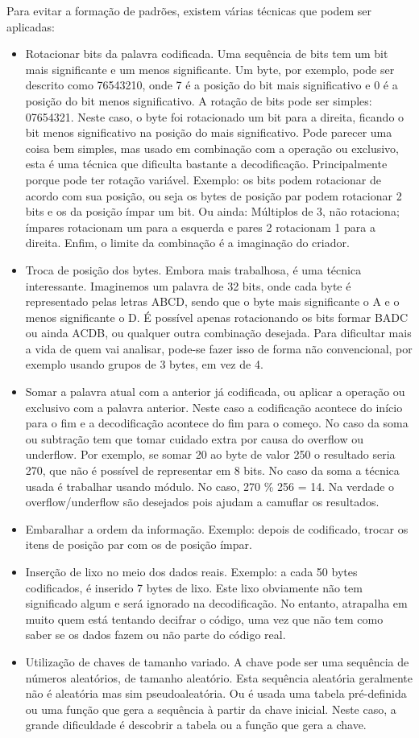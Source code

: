 Para evitar a formação de padrões, existem várias técnicas que podem ser aplicadas:
\begin{itemize}
\item Rotacionar bits da palavra codificada. Uma sequência de bits tem um bit mais significante e um menos significante. Um byte, por exemplo, pode ser descrito como 76543210, onde 7 é a posição do bit mais significativo e 0 é a posição do bit menos significativo. A rotação de bits pode ser simples: 07654321. Neste caso, o byte foi rotacionado um bit para a direita, ficando o bit menos significativo na posição do mais significativo. Pode parecer uma coisa bem simples, mas usado em combinação com a operação ou exclusivo, esta é uma técnica que dificulta bastante a decodificação. Principalmente porque pode ter rotação variável. Exemplo: os bits  podem rotacionar de acordo com sua posição, ou seja os bytes de posição par podem rotacionar 2 bits e os da  posição ímpar um bit. Ou ainda: Múltiplos de 3, não rotaciona; ímpares rotacionam um para a esquerda e pares 2 rotacionam 1 para a direita. Enfim, o limite da combinação é a imaginação do criador. 
\item Troca de posição dos bytes. Embora mais trabalhosa, é uma técnica interessante. Imaginemos um palavra de 32 bits, onde cada byte é representado pelas letras ABCD, sendo que o byte mais significante o A e o menos significante o D. É possível apenas rotacionando os bits formar BADC ou ainda ACDB, ou qualquer outra combinação desejada. Para dificultar mais a vida de quem vai analisar, pode-se fazer isso de forma não convencional, por exemplo usando grupos de 3 bytes, em vez de 4.
\item Somar a palavra atual com a anterior já codificada, ou aplicar a operação ou exclusivo com a palavra anterior. Neste caso a codificação acontece do início para o fim e a decodificação acontece do fim para o começo. No caso da soma ou subtração tem que tomar cuidado extra por causa do overflow ou underflow. Por exemplo, se somar 20 ao byte de valor 250 o resultado seria 270, que não é possível de representar em 8 bits. No caso da soma a técnica usada é trabalhar usando módulo. No caso, 270 \% 256 = 14. Na verdade o overflow/underflow são desejados pois ajudam a camuflar os resultados. 
\item Embaralhar a ordem da informação. Exemplo: depois de codificado, trocar os itens de posição par com os de posição ímpar.
\item Inserção de lixo no meio dos dados reais. Exemplo: a cada 50 bytes codificados, é inserido 7 bytes de lixo. Este lixo obviamente não tem significado algum e será ignorado na decodificação. No entanto, atrapalha em muito quem está tentando decifrar o código, uma vez que não tem como saber se os dados fazem ou não parte do código real.
\item Utilização de chaves de tamanho variado. A chave pode ser uma sequência de números aleatórios, de tamanho aleatório. Esta sequência aleatória geralmente não é aleatória mas sim pseudoaleatória\cite{wiki:4}. Ou é usada uma tabela pré-definida ou uma função que gera a sequência à partir da chave inicial. Neste caso, a grande dificuldade é descobrir a tabela ou a função que gera a chave.
\end{itemize}


